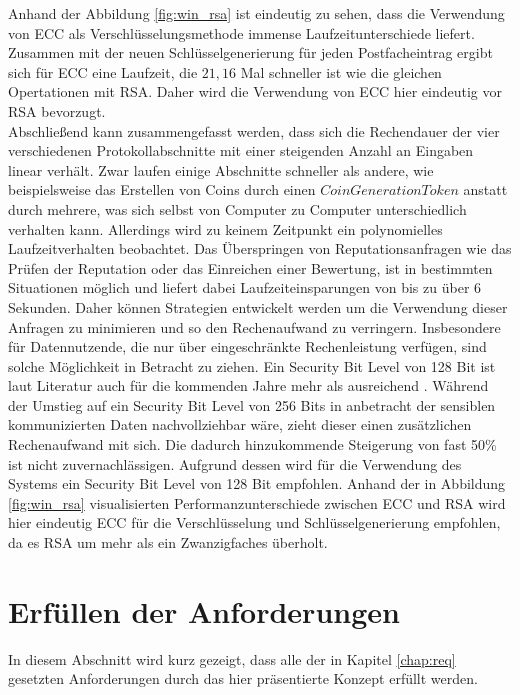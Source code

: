 \documentclass[
	fontsize=12pt,
	headings=small,
	parskip=half,           %
	bibliography=totoc,
	numbers=noenddot,       %
	open=any,               %
]{scrreprt}
\begin{document}
Anhand der Abbildung \ref{fig:win_rsa} ist eindeutig zu sehen, dass die Verwendung von ECC als Verschlüsselungsmethode immense Laufzeitunterschiede liefert. Zusammen mit der neuen Schlüsselgenerierung für jeden Postfacheintrag ergibt sich für ECC eine Laufzeit, die $21,16$ Mal schneller ist wie die gleichen Opertationen mit RSA. Daher wird die Verwendung von ECC hier eindeutig vor RSA bevorzugt.\\

Abschließend kann zusammengefasst werden, dass sich die Rechendauer der vier verschiedenen Protokollabschnitte mit einer steigenden Anzahl an Eingaben linear verhält. Zwar laufen einige Abschnitte schneller als andere, wie beispielsweise das Erstellen von Coins durch einen $CoinGenerationToken$ anstatt durch mehrere, was sich selbst von Computer zu Computer unterschiedlich verhalten kann. Allerdings wird zu keinem Zeitpunkt ein polynomielles Laufzeitverhalten beobachtet. Das Überspringen von Reputationsanfragen wie das Prüfen der Reputation oder das Einreichen einer Bewertung, ist in bestimmten Situationen möglich und liefert dabei Laufzeiteinsparungen von bis zu über 6 Sekunden. Daher können Strategien entwickelt werden um die Verwendung dieser Anfragen zu minimieren und so den Rechenaufwand zu verringern. Insbesondere für Datennutzende, die nur über eingeschränkte Rechenleistung verfügen, sind solche Möglichkeit in Betracht zu ziehen. Ein Security Bit Level von 128 Bit ist laut Literatur auch für die kommenden Jahre mehr als ausreichend \cite{elaine2016recommendation,bsi2020cryptographic}. Während der Umstieg auf ein Security Bit Level von 256 Bits in anbetracht der sensiblen kommunizierten Daten nachvollziehbar wäre, zieht dieser einen zusätzlichen Rechenaufwand mit sich. Die dadurch hinzukommende Steigerung von fast 50\% ist nicht zuvernachlässigen. Aufgrund dessen wird für die Verwendung des Systems ein Security Bit Level von 128 Bit empfohlen. Anhand der in Abbildung \ref{fig:win_rsa} visualisierten Performanzunterschiede zwischen ECC und RSA wird hier eindeutig ECC für die Verschlüsselung und Schlüsselgenerierung empfohlen, da es RSA um mehr als ein Zwanzigfaches überholt.

\section{Erfüllen der Anforderungen}
In diesem Abschnitt wird kurz gezeigt, dass alle der in Kapitel \ref{chap:req} gesetzten Anforderungen durch das hier präsentierte Konzept erfüllt werden.
\end{document}
